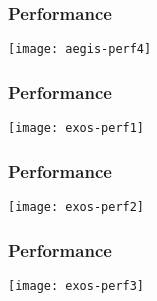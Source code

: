 \begin{frame}[plain]
	\frametitle{Performance}
	
	\centering
	\texttt{[image: aegis-perf4]}
	
\end{frame}


\begin{frame}[plain]
	\frametitle{Performance}
	
	\centering
	\texttt{[image: exos-perf1]}
	
\end{frame}



\begin{frame}[plain]
	\frametitle{Performance}
	
	\centering
	\texttt{[image: exos-perf2]}
	
\end{frame}


\begin{frame}[plain]
	\frametitle{Performance}
	
	\centering
	\texttt{[image: exos-perf3]}
	
\end{frame}




